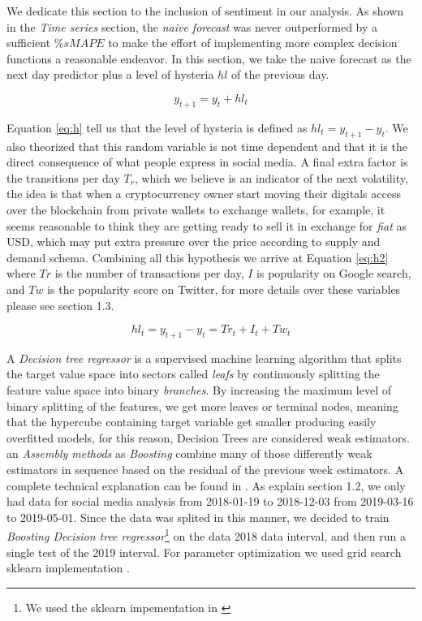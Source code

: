 We dedicate this section to the inclusion of sentiment in our analysis. As shown in the \emph{Time series} section, the \emph{naive forecast} was never outperformed by a sufficient  $\% sMAPE$  to make the effort of implementing more complex decision functions a reasonable endeavor. In this section, we take the naive forecast as the next day predictor plus a level of hysteria  $hl$ of the previous day.

\begin{equation}
y_{t+1}=y_{t}+ hl_{t}
\label{eq:h}
\end{equation}

Equation \ref{eq:h} tell us that the level of hysteria is defined as $hl_{t}=y_{t+1}-y_{t}$. We also theorized that this random variable is not time dependent and that it is the direct consequence of what people express in social media. A final extra factor is the transitions per day $T_{r}$, which we believe is an indicator of the next volatility, the idea is that when a cryptocurrency owner start moving their digitals access over the blockchain from private wallets to exchange wallets, for example, it seems reasonable to think they are getting ready to sell it in exchange for \emph{fiat} as USD, which may put extra pressure over the price according to supply and demand schema. Combining all this hypothesis we arrive at Equation \ref{eq:h2} where $Tr$ is the number of transactions per day, $I$ is popularity on Google search, and $Tw$ is the popularity score on Twitter, for more details over these variables please see section 1.3.

\begin{equation}
hl_{t}=y_{t+1}-y_{t}=Tr_{t}+I_{t}+Tw_{t}
\label{eq:h2}
\end{equation}



A \emph{Decision tree regressor} is a supervised machine learning algorithm that splits the target value space into sectors called \emph{leafs} by continuously splitting the feature value space into binary \emph{branches}. By increasing the maximum level of binary splitting of the features, we get more leaves or terminal nodes, meaning that the hypercube containing target variable get smaller producing easily overfitted models, for this reason, Decision Trees are considered weak estimators. an \emph{Assembly methods} as \emph{Boosting} combine many of those differently weak estimators in sequence based on the residual of the previous week estimators. A complete technical explanation can be found in \cite{james2013introduction}. As explain section 1.2, we only had data for social media analysis from 2018-01-19 to 2018-12-03 from 2019-03-16 to 2019-05-01. Since the data was splited in this manner, we decided to train \emph{Boosting Decision tree regressor}\footnote{ We used the sklearn impementation in \cite{scikitlearn_bo} } on the data 2018 data interval, and then run a single test of the 2019 interval. For parameter optimization we used grid search sklearn implementation \cite{scikitlearn_grid}.\\

